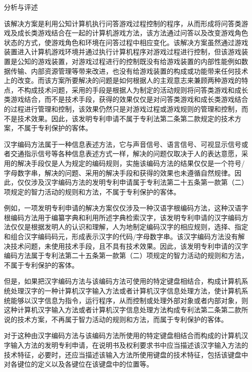 {\setlength{\parindent}{22.5bp}分析与评述\par}

该解决方案是利用公知计算机执行问答游戏过程控制的程序，从而形成将问答类游戏及成长类游戏结合在一起的计算机游戏方法，该方法通过问答以及改变游戏角色状态的方式，使游戏角色和环境在问答过程中相应变化。该解决方案虽然通过游戏装置进入计算机游戏环境并通过执行计算机程序对游戏过程进行控制，但该游戏装置是公知的游戏装置，对游戏过程进行的控制既没有给游戏装置的内部性能例如数据传输、内部资源管理等带来改进，也没有给游戏装置的构成或功能带来任何技术上的改变。而该方案所要解决的问题是如何根据人的主观意志来兼顾两种游戏的特点，不构成技术问题，采用的手段是根据人为制定的活动规则将问答类游戏和成长类游戏结合，而不是技术手段，获得的效果仅仅是对问答类游戏和成长类游戏结合的过程进行管理和控制，该效果仍然只是对游戏过程或游戏规则的管理和控制，而不是技术效果。因此，该发明专利申请不属于专利法第二条第二款规定的技术方案，不属于专利保护的客体。

汉字编码方法属于一种信息表述方法，它与声音信号、语言信号、可视显示信号或者交通指示信号等各种信息表述方式一样，解决的问题仅取决于人的表达意愿，采用的解决手段仅是人为规定的编码规则，实施该编码方法的结果仅仅是一个符号/字母数字串，解决的问题、采用的解决手段和获得的效果也未遵循自然规律。因此，仅仅涉及汉字编码方法的发明专利申请属于专利法第二十五条第一款第（二）项规定的智力活动的规则和方法，不属于专利保护的客体。

例如，一项发明专利申请的解决方案仅仅涉及一种汉语字根编码方法，这种汉语字根编码方法用于编纂字典和利用所述字典检索汉字，该发明专利申请的汉字编码方法仅仅是根据发明人的认识和理解，人为地制定编码汉字的相应规则，选择、指定和组合汉字编码码元，形成表示汉字的代码/字母数字串。该汉字编码方法没有解决技术问题，未使用技术手段，且不具有技术效果。因此，该发明专利申请的汉字编码方法属于专利法第二十五条第一款第（二）项规定的智力活动的规则和方法，不属于专利保护的客体。

但是，如果把汉字编码方法与该编码方法可使用的特定键盘相结合，构成计算机系统处理汉字的一种计算机汉字输入方法或者计算机汉字信息处理方法，使计算机系统能够以汉字信息为指令，运行程序，从而控制或处理外部对象或者内部对象，则这种计算机汉字输入方法或者计算机汉字信息处理方法构成专利法第二条第二款所说的技术方案，不再属于智力活动的规则和方法，而属于专利保护的客体。

对于这种由汉字编码方法与该编码方法所使用的特定键盘相结合而构成的计算机汉字输入方法的发明专利申请，在说明书及权利要求书中应当描述该汉字输入方法的技术特征，必要时，还应当描述该输入方法所使用键盘的技术特征，包括该键盘中对各键位的定义以及各键位在该键盘中的位置等。

